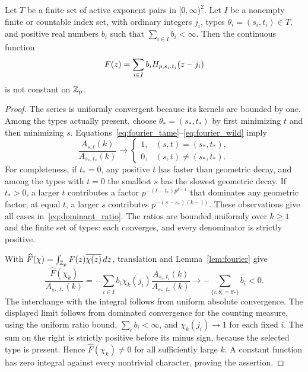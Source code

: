 \begin{lemma}\label{lem:positive_series}
Let $T$ be a finite set of active exponent pairs in $[0,\infty)^2$.
Let $I$ be a nonempty finite or countable index set, with ordinary integers
$j_i$, types $\theta_i=(s_i,t_i)\in T$, and positive real numbers $b_i$
such that $\sum_{i\in I}b_i<\infty$. Then the continuous function
\begin{equation}\label{eq:positive_series}
 F(z)=\sum_{i\in I}b_iH_{p;s_i,t_i}(z-j_i)
\end{equation}
is not constant on $\mathbb Z_p$.
\end{lemma}

\begin{proof}
The series is uniformly convergent because its kernels are bounded by one.
Among the types actually present, choose $\theta_*=(s_*,t_*)$ by first
minimizing $t$ and then minimizing $s$.
Equations~\eqref{eq:fourier_tame}--\eqref{eq:fourier_wild} imply
\begin{equation}\label{eq:dominant_ratio}
 \frac{A_{s,t}(k)}{A_{s_*,t_*}(k)}\longrightarrow
 \begin{cases}1,&(s,t)=(s_*,t_*),\\0,&(s,t)\neq(s_*,t_*).
 \end{cases}
\end{equation}
For completeness, if $t_*=0$, any positive $t$ has faster than geometric
decay, and among the types with $t=0$ the smallest $s$ has the slowest
geometric decay. If $t_*>0$, a larger $t$ contributes a factor
$p^{-(t-t_*)p^{k-1}}$ that dominates any geometric factor; at equal $t$,
a larger $s$ contributes $p^{-(s-s_*)(k-1)}$. These observations give all
cases in~\eqref{eq:dominant_ratio}.
The ratios are bounded uniformly over $k\geq1$ and the finite set of
types: each converges, and every denominator is strictly positive.

With $\widehat F(\chi)=\int_{\mathbb Z_p}F(z)\overline{\chi(z)}\,dz$,
translation and Lemma~\ref{lem:fourier} give
\begin{equation}\label{eq:fourier_sum_limit}
 \frac{\widehat F(\chi_k)}{A_{s_*,t_*}(k)}
 =-\sum_{i\in I}b_i\overline{\chi_k(j_i)}
             \frac{A_{s_i,t_i}(k)}{A_{s_*,t_*}(k)}
 \longrightarrow-\sum_{\{i:\theta_i=\theta_*\}}b_i<0.
\end{equation}
The interchange with the integral follows from uniform absolute
convergence. The displayed limit follows from dominated convergence for
the counting measure, using the uniform ratio bound, $\sum_i b_i<\infty$,
and $\chi_k(j_i)\to1$ for each fixed $i$.
The sum on the right is strictly positive before its minus sign, because
the selected type is present. Hence $\widehat F(\chi_k)\neq0$ for all
sufficiently large $k$. A constant function has zero integral against
every nontrivial character, proving the assertion.
\end{proof}

